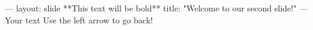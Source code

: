 ---
layout: slide
**This text will be bold**
title: "Welcome to our second slide!"
---
Your text
Use the left arrow to go back!
